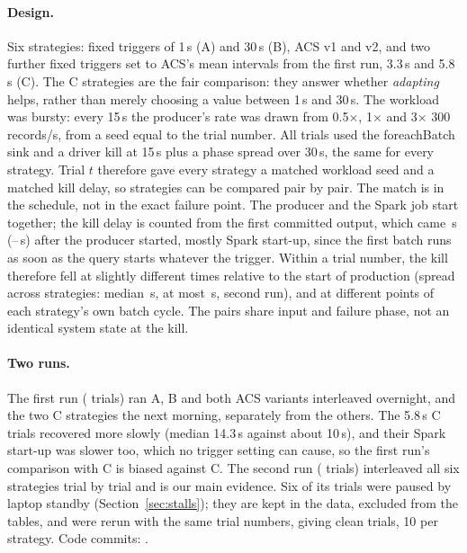 \documentclass[10pt,twocolumn]{article}
\begin{document}
\paragraph{Design.}
Six strategies: fixed triggers of 1\,s (A) and 30\,s (B), ACS v1 and v2, and two
further fixed triggers set to ACS's mean intervals from the first run, 3.3\,s
and 5.8\,s (C). The C strategies are the fair comparison: they answer whether
\emph{adapting} helps, rather than merely choosing a value between 1\,s and
30\,s. The workload was bursty: every 15\,s the producer's rate was drawn from
0.5$\times$, 1$\times$ and 3$\times$ 300 records/s, from a seed equal to the trial
number. All trials used the foreachBatch sink and a driver kill at 15\,s plus a
phase spread over 30\,s, the same for every strategy. Trial $t$ therefore gave
every strategy a matched workload seed and a matched kill delay, so strategies
can be compared pair by pair. The match is in the schedule, not in the exact
failure point. The producer and the Spark job start together; the kill delay
is counted from the first committed output, which came \FirstOutMed\,s
(\FirstOutMin--\FirstOutMax\,s) after the producer started, mostly Spark
start-up, since the first batch runs as soon as the query starts whatever the
trigger. Within a trial number, the kill therefore fell at slightly different
times relative to the start of production (spread across strategies: median
\KillSpreadMed\,s, at most \KillSpreadMax\,s, second run), and at different
points of each strategy's own batch cycle. The pairs share input and failure
phase, not an identical system state at the kill.

\paragraph{Two runs.}
The first run (\ACSTrialsOne{} trials) ran A, B and both ACS variants
interleaved overnight, and the two C strategies the next morning, separately
from the others. The 5.8\,s C trials recovered more slowly (median 14.3\,s
against about 10\,s), and their Spark start-up was slower too, which no trigger
setting can cause, so the first run's
comparison with C is biased against C. The second run (\ACSTrialsTwo{} trials)
interleaved all six strategies trial by trial and is our main evidence. Six of
its trials were paused by laptop standby (Section~\ref{sec:stalls}); they are
kept in the data, excluded from the tables, and were rerun with the same trial
numbers, giving \ACSCleanTwo{} clean trials, 10 per strategy. Code commits:
\ACSCommits.
\end{document}

